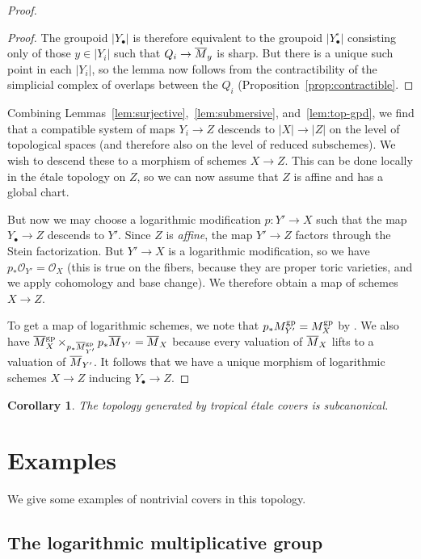 \documentclass[12pt]{amsart}
\newtheorem{corollary}[theorem]{Corollary}
\theoremstyle{definition}
\theoremstyle{remark}
\def\overnorm#1{\overline{#1}\vphantom{#1}}
\begin{document}
\begin{proof}
\begin{proof}
The groupoid $|Y_\bullet|$ is therefore equivalent to the groupoid $|Y_\bullet^\circ|$ consisting only of those $y \in |Y_i|$ such that $Q_i \to \overnorm M_y$ is sharp.  But there is a unique such point in each $|Y_i|$, so the lemma now follows from the contractibility of the simplicial complex of overlaps between the $Q_i$ (Proposition~\ref{prop:contractible}.
\end{proof}

Combining Lemmas~\ref{lem:surjective},~\ref{lem:submersive}, and~\ref{lem:top-gpd}, we find that a compatible system of maps $Y_i \to Z$ descends to $|X| \to |Z|$ on the level of topological spaces (and therefore also on the level of reduced subschemes).  We wish to descend these to a morphism of schemes $X \to Z$.  This can be done locally in the \'etale topology on $Z$, so we can now assume that $Z$ is affine and has a global chart.

But now we may choose a logarithmic modification $p : Y' \to X$ such that the map $Y_\bullet \to Z$ descends to $Y'$.  Since $Z$ is \emph{affine}, the map $Y' \to Z$ factors through the Stein factorization.  But $Y' \to X$ is a logarithmic modification, so we have $p_\ast \mathcal O_{Y'} = \mathcal O_X$ (this is true on the fibers, because they are proper toric varieties, and we apply cohomology and base change).  We therefore obtain a map of schemes $X \to Z$.

To get a map of logarithmic schemes, we note that $p_\ast M_{Y'}^{\rm gp} = M_X^{\rm gp}$ by \cite[Theorem~4.4.1]{logpic}.  We also have $\overnorm M_X^{\rm gp} \mathop\times_{p_\ast \overnorm M_{Y'}^{\rm gp}} p_\ast \overnorm M_{Y'} = \overnorm M_X$ because every valuation of $\overnorm M_X$ lifts to a valuation of $\overnorm M_{Y'}$.  It follows that we have a unique morphism of logarithmic schemes $X \to Z$ inducing $Y_\bullet \to Z$.
\end{proof}

\begin{corollary}
The topology generated by tropical \'etale covers is subcanonical.
\end{corollary}

\section{Examples}

We give some examples of nontrivial covers in this topology.

\subsection{The logarithmic multiplicative group}
\end{document}
